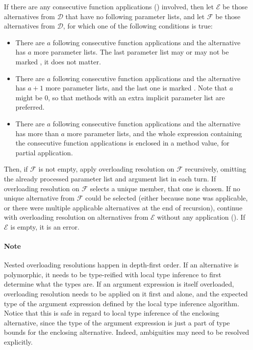 If there are any consecutive function applications () involved, then let $\mathcal{E}$ be those alternatives from $\mathcal{D}$ that have no following parameter lists, and let $\mathcal{F}$ be those alternatives from $\mathcal{D}$, for which one of the following conditions is true:
\begin{itemize}
  \item There are $a$ following consecutive function applications and the alternative has $a$ more parameter lists. The last parameter list may or may not be marked , it does not matter. 
  \item There are $a$ following consecutive function applications and the alternative has $a + 1$ more parameter lists, and the last one is marked . Note that $a$ might be 0, so that methods with an extra implicit parameter list are preferred. 
  \item There are $a$ following consecutive function applications and the alternative has more than $a$ more parameter lists, and the whole expression containing the consecutive function applications is enclosed in a method value, for partial application. 
\end{itemize}
Then, if $\mathcal{F}$ is not empty, apply overloading resolution on $\mathcal{F}$ recursively, omitting the already processed parameter list and argument list in each turn. If overloading resolution on $\mathcal{F}$ selects a unique member, that one is chosen. If no unique alternative from $\mathcal{F}$ could be selected (either because none was applicable, or there were multiple applicable alternatives at the end of recursion), continue with overloading resolution on alternatives from $\mathcal{E}$ without any application (). If $\mathcal{E}$ is empty, it is an error. 

\paragraph{Note}
Nested overloading resolutions happen in depth-first order. If an alternative is polymorphic, it needs to be type-reified with local type inference to first determine what the types are. If an argument expression is itself overloaded, overloading resolution needs to be applied on it first and alone, and the expected type of the argument expression defined by the local type inference algorithm. Notice that this is safe in regard to local type inference of the enclosing alternative, since the type of the argument expression is just a part of type bounds for the enclosing alternative. Indeed, ambiguities may need to be resolved explicitly. 

